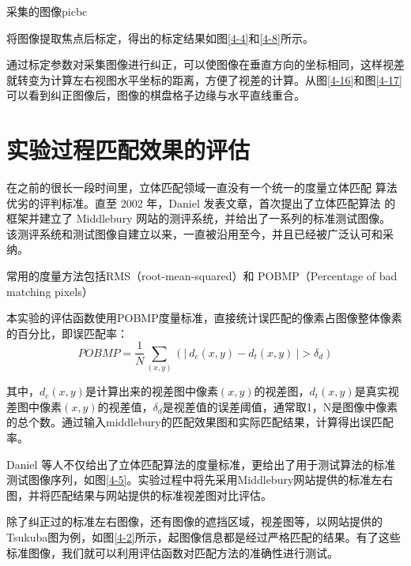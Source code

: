 \begin{pics}[h]{采集的图像}{picbc}
\end{pics}
将图像提取焦点后标定，得出的标定结果如图\ref{4-4}和\ref{4-8}所示。

通过标定参数对采集图像进行纠正，可以使图像在垂直方向的坐标相同，这样视差就转变为计算左右视图水平坐标的距离，方便了视差的计算。从图\ref{4-16}和图\ref{4-17}可以看到纠正图像后，图像的棋盘格子边缘与水平直线重合。

\section{实验过程匹配效果的评估}

在之前的很长一段时间里，立体匹配领域一直没有一个统一的度量立体匹配
算法优劣的评判标准。直至 2002 年，Daniel 发表文章，首次提出了立体匹配算法
的框架并建立了 Middlebury 网站的测评系统，并给出了一系列的标准测试图像。
该测评系统和测试图像自建立以来，一直被沿用至今，并且已经被广泛认可和采
纳。

常用的度量方法包括RMS（root-mean-squared）和 POBMP（Percentage of bad matching pixels）

本实验的评估函数使用POBMP度量标准，直接统计误匹配的像素占图像整体像素的百分比，即误匹配率：
\begin{equation}
POBMP=\frac{1}{N}\sum_{(x,y)} (|\ d_{c}(x,y)-d_{t}(x,y)\ |>\delta _{d})
\end{equation}

其中，$d_{c}(x,y)$是计算出来的视差图中像素$(x,y)$的视差图，$d_{t}(x,y)$是真实视差图中像素$(x,y)$的视差值，$\delta _{d}$是视差值的误差阈值，通常取1，N是图像中像素的总个数。通过输入middlebury的匹配效果图和实际匹配结果，计算得出误匹配率。

Daniel 等人不仅给出了立体匹配算法的度量标准，更给出了用于测试算法的标准测试图像序列，如图\ref{4-5}。实验过程中将先采用Middlebury网站提供的标准左右图，并将匹配结果与网站提供的标准视差图对比评估。


除了纠正过的标准左右图像，还有图像的遮挡区域，视差图等，以网站提供的Tsukuba图为例，如图\ref{4-2}所示，起图像信息都是经过严格匹配的结果。有了这些标准图像，我们就可以利用评估函数对匹配方法的准确性进行测试。

